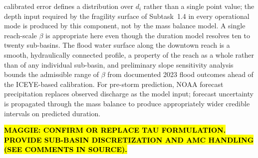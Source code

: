 \documentclass[11pt]{article}
\begin{document}
calibrated error defines a distribution over $d_i$ rather than a single point
value; the depth input required by the fragility surface of Subtask~1.4 in every
operational mode is produced by this component, not by the mass balance model.
A single reach-scale $\beta$ is appropriate here even though the duration model
resolves ten to twenty sub-basins. The flood water surface along the downtown
reach is a smooth, hydraulically connected profile, a property of the reach as a
whole rather than of any individual sub-basin, and preliminary slope sensitivity
analysis bounds the admissible range of $\beta$ from
documented 2023 flood outcomes ahead of the ICEYE-based calibration.
For pre-storm prediction, NOAA forecast precipitation replaces observed discharge
as the model input; forecast uncertainty is propagated through the mass balance to
produce appropriately wider credible intervals on predicted duration.

\hl{\textbf{MAGGIE: CONFIRM OR REPLACE TAU FORMULATION. PROVIDE SUB-BASIN DISCRETIZATION AND AMC HANDLING (SEE COMMENTS IN SOURCE).}}

%
\end{document}
